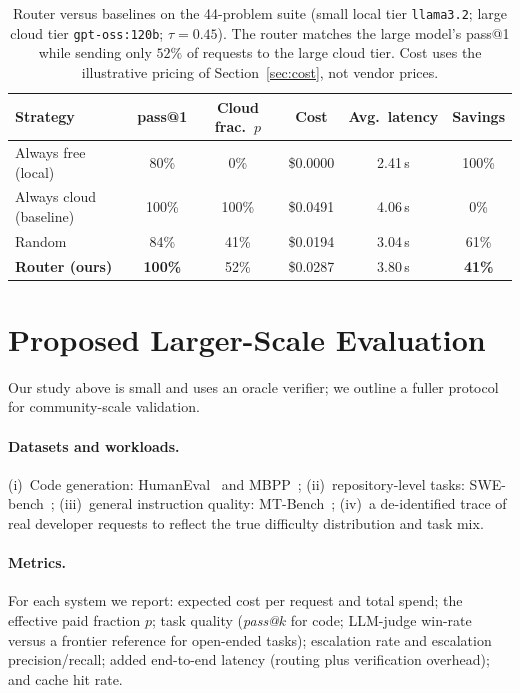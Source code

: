 \documentclass[11pt]{article}
\begin{document}
\begin{table}[t]
\centering
\small
\caption{Router versus baselines on the 44-problem suite (small local tier
\texttt{llama3.2}; large cloud tier \texttt{gpt-oss:120b}; $\tau{=}0.45$). The
router matches the large model's pass@1 while sending only $52\%$ of requests to
the large cloud tier. Cost uses the illustrative pricing of
Section~\ref{sec:cost}, not vendor prices.}
\label{tab:router}
\begin{tabular}{@{}lccccc@{}}
\toprule
Strategy & pass@1 & Cloud frac.\ $p$ & Cost & Avg.\ latency & Savings \\
\midrule
Always free (local)    & 80\%  & 0\%   & \$0.0000 & 2.41\,s & 100\% \\
Always cloud (baseline)& 100\% & 100\% & \$0.0491 & 4.06\,s & 0\% \\
Random                 & 84\%  & 41\%  & \$0.0194 & 3.04\,s & 61\% \\
\textbf{Router (ours)} & \textbf{100\%} & 52\% & \$0.0287 & 3.80\,s & \textbf{41\%} \\
\bottomrule
\end{tabular}
\end{table}

\section{Proposed Larger-Scale Evaluation}
\label{sec:eval}
Our study above is small and uses an oracle verifier; we outline a fuller
protocol for community-scale validation.

\paragraph{Datasets and workloads.}
(i)~Code generation: HumanEval~\cite{humaneval} and MBPP~\cite{mbpp};
(ii)~repository-level tasks: SWE-bench~\cite{swebench};
(iii)~general instruction quality: MT-Bench~\cite{mtbench};
(iv)~a de-identified trace of real developer requests to reflect the true
difficulty distribution and task mix.

\paragraph{Metrics.}
For each system we report: expected cost per request and total spend; the
effective paid fraction $p$; task quality (\textit{pass@}$k$ for code;
LLM-judge win-rate versus a frontier reference for open-ended tasks);
escalation rate and escalation precision/recall; added end-to-end latency
(routing plus verification overhead); and cache hit rate.
\end{document}
